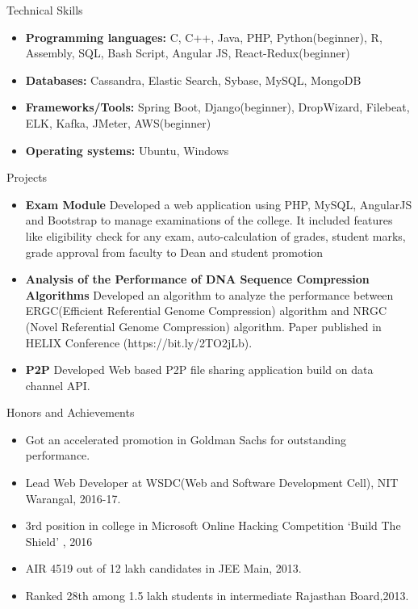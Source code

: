 \documentclass[]{mcdowellcv}
\begin{document}
\begin{cvsection}{Technical Skills}
	\begin{cvsubsection}{}{}{}
		\begin{itemize}
			\item \textbf{Programming languages:}  C, C++, Java, PHP, Python(beginner), R, Assembly, SQL, Bash Script, Angular JS, React-Redux(beginner)
			\item \textbf{Databases:} Cassandra, Elastic Search, Sybase, MySQL, MongoDB
			\item \textbf{Frameworks/Tools:} Spring Boot, Django(beginner), DropWizard, Filebeat, ELK, Kafka, JMeter, AWS(beginner)  
			\item \textbf{Operating systems:}  Ubuntu, Windows 
		 
		\end{itemize}
	\end{cvsubsection}
\end{cvsection}
\begin{cvsection}{Projects}
	\begin{cvsubsection}{}{}{}
		\begin{itemize}
			\setlength\itemsep{3pt}
		\item {\textbf{Exam Module}} Developed a web application using PHP, MySQL, AngularJS and Bootstrap to manage examinations of the college. It included features like eligibility check for any exam, auto-calculation of grades, student marks, grade approval from faculty to Dean and student promotion
			\item \textbf{Analysis of the Performance of DNA Sequence Compression Algorithms} Developed an algorithm to analyze the performance between ERGC(Efficient Referential Genome Compression) algorithm and NRGC (Novel Referential Genome Compression) algorithm. Paper published in HELIX Conference (https://bit.ly/2TO2jLb).
			\item \textbf{P2P} Developed Web based P2P file sharing application build on data channel API.
		\end{itemize}
	\end{cvsubsection}
\end{cvsection}
\begin{cvsection}{Honors and Achievements}
	\begin{cvsubsection}{}{}{}
		\begin{itemize}
			\setlength\itemsep{3pt} 
			\item Got an accelerated promotion in Goldman Sachs  for outstanding performance.
			\item Lead Web Developer at WSDC(Web and Software Development Cell), NIT Warangal, 2016-17.
			\item 3rd position in college in Microsoft Online Hacking Competition ‘Build The Shield' , 2016
			\item AIR 4519 out of 12 lakh candidates in JEE Main, 2013.
			\item Ranked 28th among 1.5 lakh students in intermediate Rajasthan Board,2013.
            
		\end{itemize}
	\end{cvsubsection}
\end{cvsection}
\end{document}
